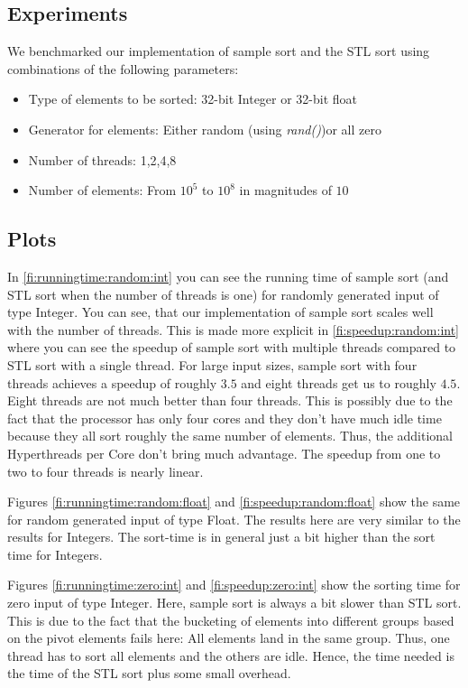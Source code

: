 \documentclass{llncs}
\begin{document}
\subsection{Experiments}
We benchmarked our implementation of sample sort and the STL sort using combinations of the following parameters:
\begin{itemize}
	\item Type of elements to be sorted: 32-bit Integer or 32-bit float
	\item Generator for elements: Either random  (using \emph{rand()})or all zero
	\item Number of threads: 1,2,4,8
	\item Number of elements: From $10^5$ to $10^8$ in magnitudes of $10$
\end{itemize}

\subsection{Plots}
In \ref{fi:runningtime:random:int} you can see the running time of sample sort (and STL sort when the number of threads is one) for randomly generated input of type Integer. You can see, that our implementation of sample sort scales well with the number of threads. This is made more explicit in \ref{fi:speedup:random:int} where you can see the speedup of sample sort with multiple threads compared to STL sort with a single thread. For large input sizes, sample sort with four threads achieves a speedup of roughly $3.5$ and eight threads get us to roughly $4.5$. Eight threads are not much better than four threads. This is possibly due to the fact that the processor has only four cores and they don't have much idle time because they all sort roughly the same number of elements. Thus, the additional Hyperthreads per Core don't bring much advantage. The speedup from one to two to four threads is nearly linear. \par
Figures \ref{fi:runningtime:random:float} and  \ref{fi:speedup:random:float} show the same for random generated input of type Float. The results here are very similar to the results for Integers. The sort-time is in general just a bit higher than the sort time for Integers. \par
Figures \ref{fi:runningtime:zero:int} and  \ref{fi:speedup:zero:int} show the sorting time for zero input of type Integer. Here, sample sort is always a bit slower than STL sort. This is due to the fact that the bucketing of elements into different groups based on the pivot elements fails here: All elements land in the same group. Thus, one thread has to sort all elements and the others are idle. Hence, the time needed is the time of the STL sort plus some small overhead. 
\end{document}
